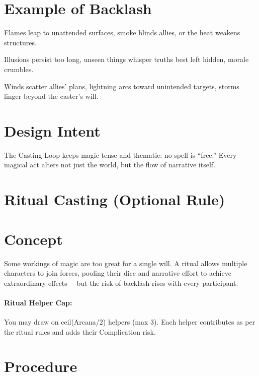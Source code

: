 \documentclass[12pt]{article}
\begin{document}
\section{Example of Backlash}
\begin{description}[leftmargin=2cm]
  \item[Fire] Flames leap to unattended surfaces, smoke blinds allies, or the heat weakens structures.  
  \item[Shadow] Illusions persist too long, unseen things whisper truths best left hidden, morale crumbles.  
  \item[Storm] Winds scatter allies’ plans, lightning arcs toward unintended targets, storms linger beyond the caster’s will.  
\end{description}

\section{Design Intent}
The Casting Loop keeps magic tense and thematic: no spell is “free.”  
Every magical act alters not just the world, but the flow of narrative itself.

\section{Ritual Casting (Optional Rule)}

\section*{Concept}
Some workings of magic are too great for a single will. 
A ritual allows multiple characters to join forces, pooling their dice and narrative effort to achieve extraordinary effects—
but the risk of backlash rises with every participant.  

\paragraph{Ritual Helper Cap:} 
You may draw on ceil(Arcana/2) helpers (max 3).
Each helper contributes as per the ritual rules and adds their Complication risk.

\section*{Procedure}
\end{document}
